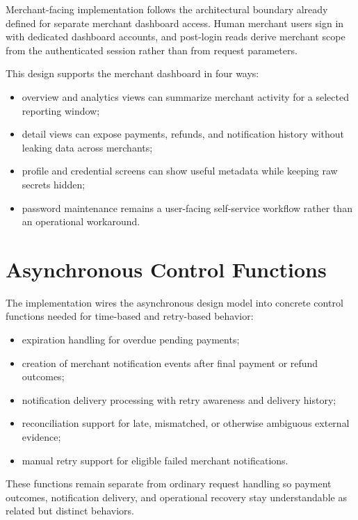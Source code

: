 Merchant-facing implementation follows the architectural boundary already
defined for separate merchant dashboard access. Human merchant users sign in
with dedicated dashboard accounts, and post-login reads derive merchant scope
from the authenticated session rather than from request parameters.

This design supports the merchant dashboard in four ways:

\begin{itemize}
  \item overview and analytics views can summarize merchant activity for a
  selected reporting window;
  \item detail views can expose payments, refunds, and notification history
  without leaking data across merchants;
  \item profile and credential screens can show useful metadata while keeping
  raw secrets hidden;
  \item password maintenance remains a user-facing self-service workflow rather
  than an operational workaround.
\end{itemize}

\section{Asynchronous Control Functions}

The implementation wires the asynchronous design model into concrete control
functions needed for time-based and retry-based behavior:

\begin{itemize}
  \item expiration handling for overdue pending payments;
  \item creation of merchant notification events after final payment or refund
  outcomes;
  \item notification delivery processing with retry awareness and delivery
  history;
  \item reconciliation support for late, mismatched, or otherwise ambiguous
  external evidence;
  \item manual retry support for eligible failed merchant notifications.
\end{itemize}

These functions remain separate from ordinary request handling so payment
outcomes, notification delivery, and operational recovery stay understandable
as related but distinct behaviors.
